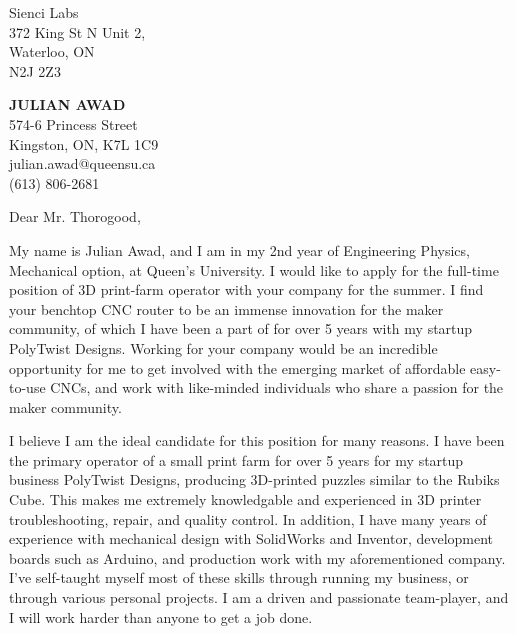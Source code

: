 \documentclass[11pt]{letter} %
\begin{document}
\begin{letter}{Sienci Labs \\
 372 King St N Unit 2,\\
 Waterloo, ON \\
 N2J 2Z3}

\begin{center}
\textbf{\huge JULIAN AWAD} \\ %
\vspace{1em} %
574-6 Princess Street \\ Kingston, ON, K7L 1C9 \\ julian.awad@queensu.ca \\ (613) 806-2681 %
\end{center}
\hspace{2em}
\signature{Julian Awad} %
\vspace{-0.3in}
\opening{Dear Mr. Thorogood,}

My name is Julian Awad, and I am in my 2nd year of Engineering Physics, Mechanical option, at Queen's University. I would like to apply for the full-time position of 3D print-farm operator with your company for the summer. I find your benchtop CNC router to be an immense innovation for the maker community, of which I have been a part of for over 5 years with my startup PolyTwist Designs. Working for your company would be an incredible opportunity for me to get involved with the emerging market of affordable easy-to-use CNCs, and work with like-minded individuals who share a passion for the maker community.

I believe I am the ideal candidate for this position for many reasons. I have been the primary operator of a small print farm for over 5 years for my startup business PolyTwist Designs, producing 3D-printed puzzles similar to the Rubiks Cube. This makes me extremely knowledgable and experienced in 3D printer troubleshooting, repair, and quality control. In addition, I have many years of experience with mechanical design with SolidWorks and Inventor, development boards such as Arduino, and production work with my aforementioned company. I've self-taught myself most of these skills through running my business, or through various personal projects. I am a driven and passionate team-player, and I will work harder than anyone to get a job done.


\end{letter}
\end{document}
